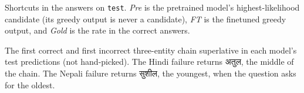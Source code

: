 \documentclass[10pt,a4paper]{article}
\newcommand{\code}[1]{\texttt{#1}}
\newcommand{\tablefile}[1]{}
\begin{document}
\begin{table}[t]
\centering\small
\tablefile{errors}
\caption{Shortcuts in the answers on \code{test}. \emph{Pre} is the pretrained model's highest-likelihood candidate (its greedy output is never a candidate), \emph{FT} is the finetuned greedy output, and \emph{Gold} is the rate in the correct answers.}
\label{tab:errors}
\end{table}

\begin{table}[t]
\centering\small
\tablefile{examples}
\caption{The first correct and first incorrect three-entity chain superlative in each model's test predictions (not hand-picked). The Hindi failure returns अतुल, the middle of the chain. The Nepali failure returns सुशील, the youngest, when the question asks for the oldest.}
\label{tab:examples}
\end{table}

\end{document}
